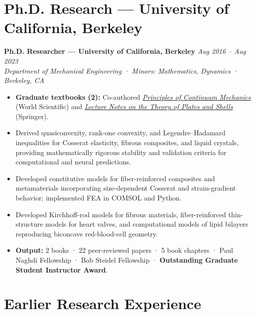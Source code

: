 \documentclass[10pt, letterpaper]{article}
\newcommand{\jobheader}[2]{%
  \noindent
  \textbf{\color{darkgray}#1}
  \hfill
  {\color{midgray}\textit{#2}}
  \\[-2pt]
}
\newcommand{\subline}[1]{%
  \noindent
  {\color{midgray}\textit{#1}}
  \par\vspace{2pt}
}
\begin{document}
\section{Ph.D. Research --- University of California, Berkeley}

\jobheader
{Ph.D. Researcher --- University of California, Berkeley}
{Aug 2016 -- Aug 2023}

\subline
{Department of Mechanical Engineering · Minors: Mathematics, Dynamics · Berkeley, CA}

\begin{itemize}

\item \textbf{Graduate textbooks (2):}
Co-authored
\href{https://www.worldscientific.com/worldscibooks/10.1142/14150}
{\textit{Principles of Continuum Mechanics}}
(World Scientific) and
\href{https://link.springer.com/book/10.1007/978-3-031-25674-5}
{\textit{Lecture Notes on the Theory of Plates and Shells}}
(Springer).

\item Derived quasiconvexity, rank-one convexity, and Legendre--Hadamard
inequalities for Cosserat elasticity, fibrous composites, and liquid crystals,
providing mathematically rigorous stability and validation criteria for
computational and neural predictions.

\item Developed constitutive models for fiber-reinforced composites and
metamaterials incorporating size-dependent Cosserat and strain-gradient
behavior; implemented FEA in COMSOL and Python.

\item Developed Kirchhoff-rod models for fibrous materials, fiber-reinforced
thin-structure models for heart valves, and computational models of lipid
bilayers reproducing biconcave red-blood-cell geometry.

\item \textbf{Output:}
2 books · 22 peer-reviewed papers · 5 book chapters ·
Paul Naghdi Fellowship · Bob Steidel Fellowship ·
\textbf{Outstanding Graduate Student Instructor Award}.

\end{itemize}



\section{Earlier Research Experience}
\end{document}
